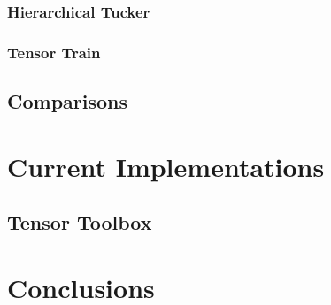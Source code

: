 \documentclass[10pt]{article}
\begin{document}
\subsubsection{Hierarchical Tucker}
\subsubsection{Tensor Train}
\subsection{Comparisons}
\section{Current Implementations}
\subsection{Tensor Toolbox}


\section{Conclusions} \label{sec:conclusions}



 



\end{document}
